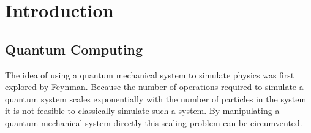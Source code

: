 \chapter{Introduction}







\section{Quantum Computing}
The idea of using a quantum mechanical system to simulate physics was first explored by Feynman\cite{Feynman1982Simulating}.
Because the number of operations required to simulate a quantum system scales exponentially with the number of particles in the system it is not feasible to classically simulate such a system.
By manipulating a quantum mechanical system directly this scaling problem can be circumvented.

